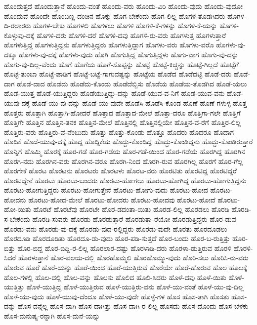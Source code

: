 {ಹೊಂದುತ್ತದೆ
ಹೊಂದುತ್ತಾನೆ
ಹೊಂದು-ವಂತೆ
ಹೊಂದು-ವರು
ಹೊಂದು-ವಿರಿ
ಹೊಂದು-ವುದು
ಹೊಂದು-ವುದೋ
ಹೊಂದುವೆ
ಹೊಂದೇ
ಹೊಂಬಣ್ಣ-ದಂಚಿನ
ಹೊಕ್ಕು
ಹೊಗ-ಬೇಕೆಂದು
ಹೊಗ-ಲಿಲ್ಲ
ಹೊಗಳ-ತೊಡಗಿದರು
ಹೊಗಳ-ದಿ-ರಲಾರರು
ಹೊಗಳ-ಬೇಕು
ಹೊಗಳಲಿ
ಹೊಗಳಲು
ಹೊಗಳಿ
ಹೊಗಳಿ-ಕೆ-ಗಳನ್ನು
ಹೊಗಳಿ-ಕೆ-ಯನ್ನು
ಹೊಗಳಿ-ಕೊಳ್ಳುವು-ದಕ್ಕೆ
ಹೊಗಳಿ-ದರು
ಹೊಗಳಿ-ದರೆ
ಹೊಗಳಿ-ದವು
ಹೊಗಳಿ-ರು-ವರು
ಹೊಗಳುತ್ತ
ಹೊಗಳುತ್ತಾರೆ
ಹೊಗಳುತ್ತಿದ್ದ
ಹೊಗಳುತ್ತಿದ್ದನು
ಹೊಗಳುತ್ತಿದ್ದರು
ಹೊಗಳುತ್ತಿದ್ದಾಗ
ಹೊಗಳು-ವರು
ಹೊಗಳು-ವರೊ
ಹೊಗಳು-ವು-ದಕ್ಕೂ
ಹೊಗಳು-ವು-ದಕ್ಕೆ
ಹೊಗಳು-ವುದು
ಹೊಗಿ
ಹೊಗುತ್ತಿದ್ದ
ಹೊಗುತ್ತಿದ್ದಳು
ಹೊಗು-ವಾಗ
ಹೊಗು-ವು-ದನ್ನು
ಹೊಗು-ವು-ದಿಲ್ಲ-ವೆಂದು
ಹೊಗೆ
ಹೊಗೆಯ
ಹೊಗೆ-ಸೊಪ್ಪನ್ನು
ಹೊಟ್ಟೆ
ಹೊಟ್ಟೆ-ಕಿಚ್ಚನ್ನು
ಹೊಟ್ಟೆ-ಗಿಲ್ಲದೆ
ಹೊಟ್ಟೆಗೆ
ಹೊಟ್ಟೆ-ತುಂಬಾ
ಹೊಟ್ಟೆ-ಪಾಡಿಗೆ
ಹೊಟ್ಟೆ-ಬಟ್ಟೆ-ಗಾಗುವಷ್ಟನ್ನು
ಹೊಟ್ಟೆಯ
ಹೊಡೆದ
ಹೊಡೆದಟ್ಟಿ
ಹೊಡೆ-ದರು
ಹೊಡೆ-ದಾಗ
ಹೊಡೆ-ದಾದ
ಹೊಡೆದು
ಹೊಡೆದು-ಕೊಂಡು
ಹೊಡೆದೆಬ್ಬಿಸು
ಹೊಡೆಯ
ಹೊಡೆಯ-ತೊಡಗಿದ
ಹೊಡೆ-ಯಲು
ಹೊಡೆ-ಯುತ್ತ
ಹೊಡೆ-ಯುತ್ತಿದ್ದರು
ಹೊಡೆಯುತ್ತಿದ್ದು-ದನ್ನು
ಹೊಡೆ-ಯುವ-ವ-ನಿಗೆ
ಹೊಡೆ-ಯುವ-ವನು
ಹೊಡೆ-ಯುವು-ದಕ್ಕೆ
ಹೊಡೆ-ಯು-ವು-ದನ್ನು
ಹೊಡೆ-ಯು-ವುದೇ
ಹೊಡೆಸಿ
ಹೊಡೆಸಿ-ಕೊಂಡ
ಹೊಣೆ
ಹೊಣೆ-ಗಳುಳ್ಳ
ಹೊತ್ತ
ಹೊತ್ತರು
ಹೊತ್ತಾಗಿ
ಹೊತ್ತಾಗಿ-ಹೋದರೆ
ಹೊತ್ತಾದ
ಹೊತ್ತಾದ-ಮೇಲೆ
ಹೊತ್ತಾ-ದರೂ
ಹೊತ್ತಿಗಾ-ಗಲೇ
ಹೊತ್ತಿಗೆ
ಹೊತ್ತಿಗೇ
ಹೊತ್ತಿನ
ಹೊತ್ತಿನ-ತನಕ
ಹೊತ್ತಿನ-ಮೇಲೆ
ಹೊತ್ತಿನಲ್ಲಿ
ಹೊತ್ತಿನಲ್ಲಿಯೇ
ಹೊತ್ತಿನ-ವ-ರೆಗೆ
ಹೊತ್ತಿರ-ಲಿಲ್ಲ
ಹೊತ್ತಿರು-ವರು
ಹೊತ್ತಿರು-ವೆ-ನೆಂಬುದು
ಹೊತ್ತು
ಹೊತ್ತು-ಕೊಂಡು
ಹೊತ್ತೂ
ಹೊದರು
ಹೊದರೂ
ಹೊದಾಗ
ಹೊದಿಕೆ
ಹೊದೆ-ಯುವು-ದಕ್ಕೆ
ಹೊದ್ದ
ಹೊದ್ದಿಕೆಯ
ಹೊದ್ದು-ಕೊಂಡಿದ್ದ
ಹೊದ್ದು-ಕೊಂಡಿದ್ದನು
ಹೊದ್ದು-ಕೊಂಡಿರುತ್ತಾರೆ
ಹೊನ್ನಿಗೆ
ಹೊಮ್ಮಿ
ಹೊರಕ್ಕೆ
ಹೊರ-ಗಡೆ
ಹೊರ-ಗಡೆಯ
ಹೊರ-ಗಡೆ-ಯಿಂದ
ಹೊರ-ಗಡೆಯೆ
ಹೊರಗಿದ್ದ
ಹೊರಗಿನ
ಹೊರಗಿ-ನದು
ಹೊರಗಿನ-ವರು
ಹೊರಗಿನ-ವರೂ
ಹೊರಗಿ-ನಿಂದ
ಹೊರಗಿ-ರುವ
ಹೊರಗಿಲ್ಲ
ಹೊರಗೆ
ಹೊರ-ಗೆಲ್ಲ
ಹೊರಗೇಕೆ
ಹೊರಟ
ಹೊರಟನು
ಹೊರಟರು
ಹೊರಟಳು
ಹೊರಟ-ವರು
ಹೊರಟಿತು
ಹೊರಟಿದ್ದ
ಹೊರಟಿದ್ದರೆ
ಹೊರಟಿದ್ದೇನೆ
ಹೊರಟು
ಹೊರಟು-ಬಂದರು
ಹೊರಟು-ಹೋಗಲು
ಹೊರಟು-ಹೋಗಿದ್ದ
ಹೊರಟು-ಹೋಗುತ್ತಿದ್ದನು
ಹೊರಟು-ಹೋಗುತ್ತಿದ್ದರು
ಹೊರಟು-ಹೋಗುತ್ತೇನೆ
ಹೊರಟು-ಹೋಗು-ವುದು
ಹೊರಟು-ಹೋದ
ಹೊರಟು-ಹೋದನು
ಹೊರಟು-ಹೋದ-ಮೇಲೆ
ಹೊರಟು-ಹೋದರು
ಹೊರಟು-ಹೋದವು
ಹೊರಟು-ಹೋದೆ
ಹೊರಟು-ಹೋ-ಯಿತು
ಹೊರಟೆ
ಹೊರಟೆವು
ಹೊರಟೇ
ಹೊರ-ಡದಂತಾ-ಯಿತು
ಹೊರಡ-ಲಿಲ್ಲ
ಹೊರಡಲು
ಹೊರಡಿ
ಹೊರಡಿ-ಸ-ಬೇಕೆಂದು
ಹೊರಡಿ-ಸುವರು
ಹೊರಡು
ಹೊರಡುತ್ತಾರೆ
ಹೊರಡುತ್ತಾ-ರೆಯೋ
ಹೊರಡುತ್ತಿದ್ದರು
ಹೊರ-ಡುವ
ಹೊರಡು-ವನು
ಹೊರಡು-ವು-ದಕ್ಕೆ
ಹೊರಡು-ವುದ-ರಲ್ಲಿದ್ದರು
ಹೊರಡು-ವುದೇ
ಹೊರತು
ಹೊರದೂಡಲು
ಹೊರದೂಡಿ
ಹೊರದೂಡಿತು
ಹೊರದೂ-ಡು-ವುದು
ಹೊರ-ಪಡಿ-ಸುತ್ತದೆ
ಹೊರ-ಬಂದು
ಹೊರ-ಬ-ರುತ್ತಿತ್ತು
ಹೊರ-ಬಿತ್ತು
ಹೊರ-ಬಿದ್ದ
ಹೊರ-ಬಿದ್ದಿ-ರ-ಲಿಲ್ಲ
ಹೊರಲಾರ-ದಷ್ಟು
ಹೊರಳಾಡಿ-ದರು
ಹೊರಳಾ-ಡುತ್ತಿರುವ
ಹೊರಳಿ
ಹೊರಳಿ-ಸಿದರೆ
ಹೊರಳುತ್ತಾನೆ
ಹೊರ-ವಲಯ-ದಲ್ಲಿ
ಹೊರಹೊಮ್ಮಲಿ
ಹೊರಹೊಮ್ಮು-ವುದು
ಹೊರಿ-ಸಲು
ಹೊರಿಸಿ-ರು-ವರು
ಹೊರುವ
ಹೊರೆ
ಹೊರೆ-ಯನ್ನು
ಹೊರೆ-ಯಿಂದ
ಹೊರೆ-ಯುತ್ತಿರುವೆ
ಹೊರೆಯೇ
ಹೊರೆ-ಹೊರುವ
ಹೊಲ
ಹೊಲಕ್ಕೆ
ಹೊಲ-ಗಳಲ್ಲಿ
ಹೊಲ-ದಲ್ಲಿ
ಹೊಲ-ವನ್ನು
ಹೊಲಸು
ಹೊಲಿದ
ಹೊಲಿ-ಸಿದರು
ಹೊಳೆ-ದವು
ಹೊಳೆ-ಯಿತು
ಹೊಳೆ-ಯುತ್ತಿತ್ತು
ಹೊಳೆ-ಯುತ್ತಿದ್ದ
ಹೊಳೆ-ಯುತ್ತಿರುವ
ಹೊಳೆ-ಯುತ್ತಿರು-ವನು
ಹೊಳೆ-ಯು-ವಂತೆ
ಹೊಳೆ-ಯು-ವು-ದಿಲ್ಲ
ಹೊಳೆ-ಯು-ವುದು
ಹೊಳೆ-ಯುವು-ದೆಂದೂ
ಹೊಳೆ-ಯು-ವುದೇ
ಹೊಳ್ಳೆ-ಗಳ
ಹೊಸ
ಹೊಸ-ತಾಗಿ
ಹೊಸತು
ಹೊಸ-ದನ್ನು
ಹೊಸ-ದನ್ನೆಲ್ಲ
ಹೊಸ-ದಾಗಿ
ಹೊಸ-ದಾಗಿತ್ತು
ಹೊಸ-ದಾಗಿ-ರ-ಲಿಲ್ಲ
ಹೊಸದು
ಹೊಸ-ದೊಂದು
ಹೊಸ-ಬೆಳಕು
ಹೊಸ-ಮನುಷ್ಯ-ರನ್ನಾಗಿ
ಹೊಸ-ಮನೆ-ಯನ್ನು
}
